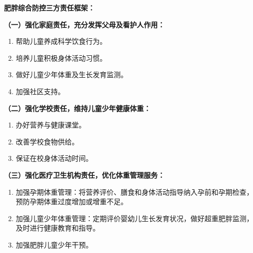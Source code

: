 \begin{defbox}
\textbf{肥胖综合防控三方责任框架：}

\textbf{（一）强化家庭责任，充分发挥父母及看护人作用：}
\begin{enumerate}[leftmargin=*]
    \item 帮助儿童养成科学饮食行为。
    \item 培养儿童积极身体活动习惯。
    \item 做好儿童少年体重及生长发育监测。
    \item 加强社区支持。
\end{enumerate}

\textbf{（二）强化学校责任，维持儿童少年健康体重：}
\begin{enumerate}[leftmargin=*]
    \item 办好营养与健康课堂。
    \item 改善学校食物供给。
    \item 保证在校身体活动时间。
\end{enumerate}

\textbf{（三）强化医疗卫生机构责任，优化体重管理服务：}
\begin{enumerate}[leftmargin=*]
    \item 加强孕期体重管理：将营养评价、膳食和身体活动指导纳入孕前和孕期检查，预防孕期体重过度增加或增重不足。
    \item 加强儿童少年体重管理：定期评价婴幼儿生长发育状况，做好超重肥胖监测，及时进行健康教育和指导。
    \item 加强肥胖儿童少年干预。
\end{enumerate}
\end{defbox}

